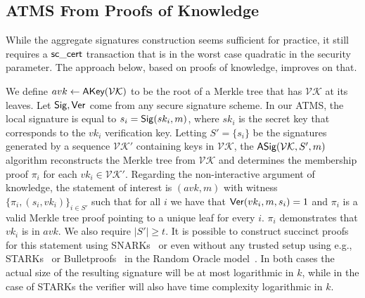 \subsection{ATMS From Proofs of Knowledge}

While the aggregate signatures construction seems sufficient for practice,
it still requires a $\mathsf{sc\_cert}$ transaction that is in the worst case quadratic in
the security parameter.
The approach below, based on proofs of knowledge, improves on that.

We define $avk \gets \textsf{AKey}(\mathcal{VK})$ to be the root of a Merkle tree
that has $\mathcal{VK}$ at its leaves. Let $\mathsf{Sig}, \mathsf{Ver}$ come from any secure signature
scheme.
In our ATMS, the local signature is equal to $s_i = \mathsf{Sig}(sk_i, m)$, where
$sk_i$ is the secret key that corresponds to the $vk_i$ verification key.
Letting $S' = \{s_i\}$ be the signatures generated by a sequence $\mathcal{VK}'$
containing keys in $\mathcal{VK}$, the $\textsf{ASig}(\mathcal{VK}, S', m)$
algorithm reconstructs the Merkle tree from $\mathcal{VK}$ and determines the
membership proof $\pi_i$ for each $vk_i \in \mathcal{VK}'$. Regarding the
non-interactive argument of knowledge, the statement of interest is $(avk, m)$
with witness $\{\pi_i, (s_i, vk_i)\}_{i\in S'}$ such that for all $i$ we have that
$\mathsf{Ver}(vk_i, m, s_i) = 1$ and $\pi_i$ is a valid Merkle tree proof pointing to a
unique leaf for every $i$. $\pi_i$ demonstrates that $vk_i$ is in $avk$. We also
require $|S'| \geq t$. It is possible to construct succinct proofs for this
statement using SNARKs~\cite{ITCS:BCCT12} or even without any trusted setup
using e.g., STARKs~\cite{ben2017scalable} or
Bulletproofs~\cite{bunzbulletproofs} in the Random Oracle
model~\cite{CCS:BelRog93}. In both cases the actual size of the resulting
signature will be at most logarithmic in $k$, while in the case of STARKs the
verifier will also have time complexity logarithmic in $k$.
